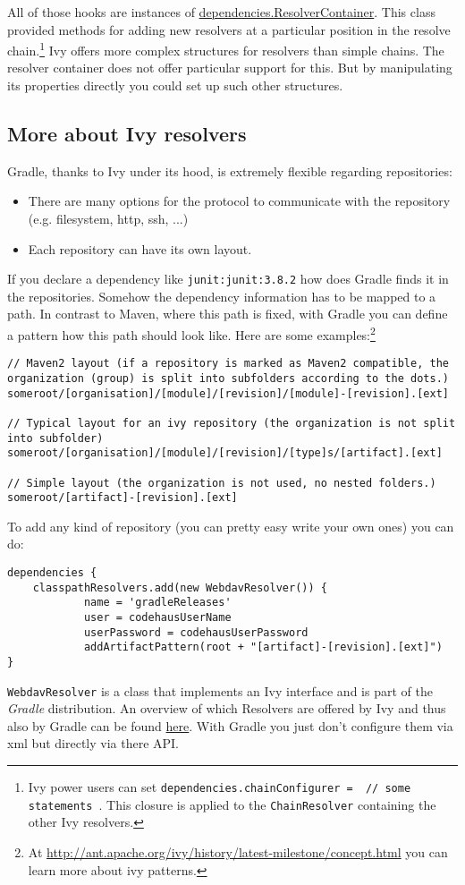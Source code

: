 All of those hooks are instances of \href{\API dependencies/ResolverContainer.html}{\PKG dependencies.ResolverContainer}. This class provided methods for adding new resolvers at a particular position in the resolve chain.\footnote{Ivy power users can set \texttt{dependencies.chainConfigurer = { // some statements }}. This closure is applied to the \texttt{ChainResolver} containing the other Ivy resolvers.} Ivy offers more complex structures for resolvers than simple chains. The resolver container does not offer particular support for this. But by manipulating its properties directly you could set up such other structures.

\subsection{More about Ivy resolvers} %
\label{sub:more_about_ivy_resolvers}
Gradle, thanks to Ivy under its hood, is extremely flexible regarding repositories:
\begin{itemize}
	\item There are many options for the protocol to communicate with the repository (e.g. filesystem, http, ssh, ...)
	\item Each repository can have its own layout.
\end{itemize}
If you declare a dependency like \texttt{junit:junit:3.8.2} how does Gradle finds it in the repositories. Somehow the dependency information has to be mapped to a path. In contrast to Maven, where this path is fixed, with Gradle you can define a pattern how this path should look like. Here are some examples:\footnote{At \url{http://ant.apache.org/ivy/history/latest-milestone/concept.html} you can learn more about ivy patterns.}
\begin{Verbatim}
// Maven2 layout (if a repository is marked as Maven2 compatible, the organization (group) is split into subfolders according to the dots.)
someroot/[organisation]/[module]/[revision]/[module]-[revision].[ext]

// Typical layout for an ivy repository (the organization is not split into subfolder)
someroot/[organisation]/[module]/[revision]/[type]s/[artifact].[ext]

// Simple layout (the organization is not used, no nested folders.)
someroot/[artifact]-[revision].[ext]
\end{Verbatim}
To add any kind of repository (you can pretty easy write your own ones) you can do:
\begin{Verbatim}
dependencies {
	classpathResolvers.add(new WebdavResolver()) {
	        name = 'gradleReleases'
	        user = codehausUserName
	        userPassword = codehausUserPassword
	        addArtifactPattern(root + "[artifact]-[revision].[ext]")
}
\end{Verbatim}
\texttt{WebdavResolver} is a class that implements an Ivy interface and is part of the \emph{Gradle} distribution. An overview of which Resolvers are offered by Ivy and thus also by Gradle can be found \href{http://ant.apache.org/ivy/latest-milestone/configuration/resolvers.html}{here}. With Gradle you just don't configure them via xml but directly via there API.
